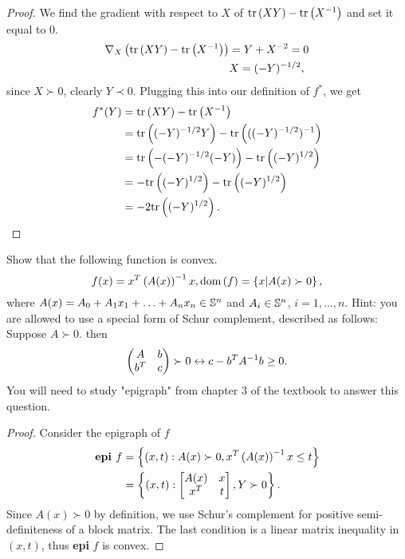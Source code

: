 \documentclass{exam}
\begin{document}
\begin{questions}
\begin{proof}
        We find the gradient with respect to $X$ of $\tr{XY} - \tr{X^\inv}$ and set it equal to 0.
        \begin{align*}
            \nabla_X \paren{\tr{XY} - \tr{X^\inv}} &= Y + X^{-2} = 0 \\
            & X = (-Y)^{-1/2},
        \end{align*}
        since $X \succ 0$, clearly $Y \prec 0$. Plugging this into our definition of $f^*$, we get
        \begin{align*}
            f^*(Y) &= \tr{XY} - \tr{X^\inv} \\
            &= \tr{(-Y)^{-1/2}Y} - \tr{((-Y)^{-1/2})^\inv} \\
            &= \tr{-(-Y)^{-1/2}(-Y)} - \tr{(-Y)^{1/2}} \\
            &= -\tr{(-Y)^{1/2}} - \tr{(-Y)^{1/2}} \\
            &= -2\tr{(-Y)^{1/2}}.
        \end{align*}
    \end{proof}







    \newpage
    \question Show that the following function is convex.
    $$f(x) = x^T\paren{A(x)}^\inv x, \dom{f} = \cbrac{x | A(x) \succ 0},$$
    where $A(x) = A_0 + A_1x_1 + \hdots + A_nx_n \in\S^n$ and $A_i\in\S^n$, $i = 1, \hdots, n$. Hint: you are allowed to use
    a special form of Schur complement, described as follows: Suppose $A \succ 0$. then
    $$\paren{\begin{matrix}
        A & b \\
        b^T & c
    \end{matrix}} \succ 0 \leftrightarrow c - b^TA^\inv b \geq 0.$$
    You will need to study "epigraph" from chapter 3 of the textbook to answer this question.
    \begin{proof}
        Consider the epigraph of $f$
        \begin{align*}
            \textbf{epi } f &= \cbrac{(x, t) : A(x) \succ 0, x^T\paren{A(x)}^\inv x \leq t} \\
            &= \cbrac{(x, t) : \brac{\begin{matrix}
                A(x) & x \\
                x^T & t
            \end{matrix}}, Y \succ 0}.
        \end{align*}
        Since $A(x) \succ 0$ by definition, we use Schur's complement for positive semi-definiteness of a block matrix. The last 
        condition is a linear matrix inequality in $(x, t)$, thus \textbf{epi} $f$ is convex.
    \end{proof}


\end{questions}
\end{document}
